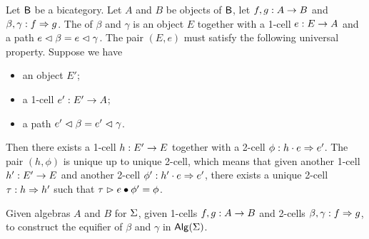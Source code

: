 \begin{definition}\label{def:equifier}
Let $\mathsf{B}$ be a bicategory. Let $A$ and $B$ be objects of $\mathsf{B}$, let $f,
g : A \rightarrow B$ and $\beta,\gamma : f \Rightarrow
g$. The  of $\beta$ and $\gamma$ is an object $E$
together with a 1-cell $e : E \rightarrow A$ and a path
$e \vartriangleleft \beta = e \vartriangleleft \gamma$.
The pair $(E,e)$ must satisfy the following universal
property. Suppose we have
\begin{itemize}
\item an object $E'$;
\item a 1-cell $e' : E' \rightarrow A$;
\item a path $e' \vartriangleleft \beta = e' \vartriangleleft \gamma$.
\end{itemize}
Then there exists a 1-cell $h : E' \rightarrow E$ together with a 2-cell
$\phi : h \cdot e \Rightarrow e'$. The pair $(h,\phi)$ is unique up to unique 2-cell, which means that
given another 1-cell $h' : E' \rightarrow E$ and another 2-cell $\phi' :
h' \cdot e \Rightarrow e'$, there exists a unique 2-cell $\tau : h
\Rightarrow h'$ such that $\tau \vartriangleright e \bullet \phi' = \phi$.
\end{definition}

\begin{problem}
\label{prob:equifier}
Given algebras $A$ and $B$ for $\Sigma$, given 1-cells $f,g :
A \rightarrow B$ and 2-cells $\beta,\gamma : f \Rightarrow g$, to construct the
equifier of $\beta$ and $\gamma$ in $\mathsf{Alg}(\Sigma)$.
\end{problem}

